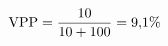 \documentclass[preview]{standalone}
\begin{document}
\begin{align*}
\special{dvisvgm:raw <g id='unique000'>}\text{VPP} = \frac{10}{10+100} = 9{,}1\%\special{dvisvgm:raw </g>}
\end{align*}
\end{document}
